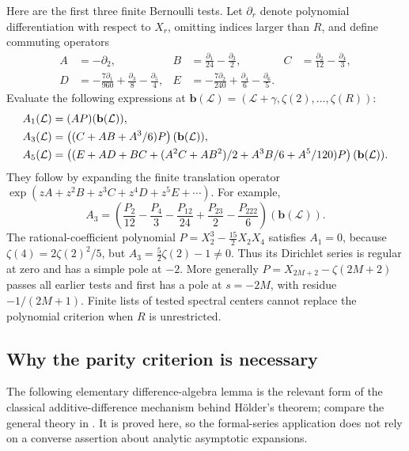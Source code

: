 \documentclass[11pt]{article}
\numberwithin{equation}{section}
\theoremstyle{definition}
\theoremstyle{remark}
\begin{document}
Here are the first three finite Bernoulli tests. Let $\partial_r$
denote polynomial differentiation with respect to $X_r$, omitting
indices larger than $R$, and define commuting operators
\begin{align*}
 A&=-\partial_2,&
 B&=\frac{\partial_1}{24}-\frac{\partial_3}{2},&
 C&=\frac{\partial_2}{12}-\frac{\partial_4}{3},\\
 D&=-\frac{7\partial_1}{960}+\frac{\partial_3}{8}
                    -\frac{\partial_5}{4},&
 E&=-\frac{7\partial_2}{240}+\frac{\partial_4}{6}
                    -\frac{\partial_6}{5}.
\end{align*}
Evaluate the following expressions at
$\mathbf b(\mathcal L)=(\mathcal L+\gamma,\zeta(2),\ldots,\zeta(R))$:
\begin{align}
 A_1(\mathcal L)&=(AP)(\mathbf b(\mathcal L)),\notag\\
 A_3(\mathcal L)&=\left((C+AB+A^3/6)P\right)(\mathbf b(\mathcal L)),\label{hc:first-tests}\\
 A_5(\mathcal L)&=\left((E+AD+BC+(A^2C+AB^2)/2
                   +A^3B/6+A^5/120)P\right)(\mathbf b(\mathcal L)).\notag
\end{align}
They follow by expanding the finite translation operator
$\exp(zA+z^2B+z^3C+z^4D+z^5E+\cdots)$.
For example,
\[
 A_3=\left(\frac{P_2}{12}-\frac{P_4}{3}
   -\frac{P_{12}}{24}+\frac{P_{23}}2-\frac{P_{222}}6\right)(\mathbf b(\mathcal L)).
\]
The rational-coefficient polynomial
$P=X_2^3-\tfrac{15}{2}X_2X_4$ satisfies $A_1=0$, because
$\zeta(4)=2\zeta(2)^2/5$, but
$A_3=\tfrac52\zeta(2)-1\ne0$. Thus its Dirichlet series is regular
at zero and has a simple pole at $-2$. More generally
$P=X_{2M+2}-\zeta(2M+2)$ passes all earlier tests and first has a
pole at $s=-2M$, with residue $-1/(2M+1)$. Finite lists of tested
spectral centers cannot replace the polynomial criterion when $R$
is unrestricted.

\subsection{Why the parity criterion is necessary}

The following elementary difference-algebra lemma is the relevant
form of the classical additive-difference mechanism behind
H\"older's theorem; compare the general theory in \cite{HardouinSinger}. It is proved here, so the formal-series application
does not rely on a converse assertion about analytic asymptotic
expansions.
\end{document}
